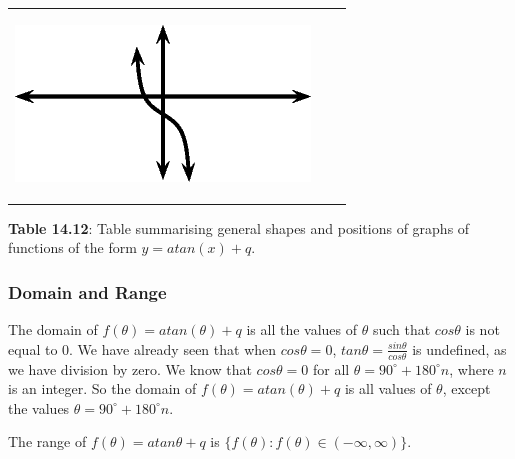 \begin{center}
\begin{xtabular*}{\mytablewidth}[t]{|p{10\mystarwidth}|p{10\mystarwidth}|p{10\mystarwidth}|}
    \setcounter{subfigure}{0}
\label{m39414*id91042}
    \begin{center}
    \label{m39414*id91042!!!underscore!!!media}\label{m39414*id91042!!!underscore!!!printimage}\includegraphics[width=.2\columnwidth]{col11306.imgs/m39414_MG10C15_037.png} %
      \vspace{2pt}
    \vspace{.1in}
    \end{center}    
     \tabularnewline{}
    \end{xtabular*}
      \end{center}
    \begin{center}{\small\bfseries Table 14.12}: Table summarising general shapes and positions of graphs of functions of the form $y=atan\left(x\right)+q$.\end{center}
    \par
        \label{m39414*uid87}
            \subsubsection{ Domain and Range}
            \nopagebreak
          \label{m39414*id91059}The domain of $f\left(\theta \right)=atan\left(\theta \right)+q$ is all the values of $\theta $ such that $cos\theta $ is not equal to 0. We have already seen that when $cos\theta =0$, $tan\theta =\frac{sin\theta }{cos\theta }$ is undefined, as we have division by zero. We know that $cos\theta =0$ for all $\theta ={90}^{\circ }+{180}^{\circ }n$, where $n$ is an integer. So the domain of $f\left(\theta \right)=atan\left(\theta \right)+q$ is all values of $\theta $, except the values $\theta ={90}^{\circ }+{180}^{\circ }n$.\par 
          \label{m39414*id91313}The range of $f\left(\theta \right)=atan\theta +q$ is $\{f\left(\theta \right):f\left(\theta \right)\in \left(-\infty ,\infty \right)\}$.\par 
        \label{m39414*uid88}
